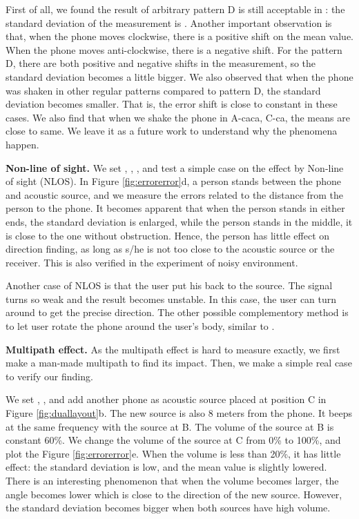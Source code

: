 \documentclass[]{sig-alternate-10pt}
\begin{document}
First of all, we found the result of arbitrary pattern D is still
 acceptable in : the standard deviation of the
 measurement is .
Another important observation is that, when the phone moves clockwise,
there is a positive shift on the mean value. 
When the phone moves anti-clockwise, there is a negative shift. 
For the pattern D, there are both positive and negative shifts in the
 measurement, so the standard deviation becomes a little bigger.
We also observed that when the phone was shaken in other regular
 patterns compared to pattern D, the standard deviation
 becomes smaller.
That is, the error shift is close
 to constant in these cases.
We also find that when we shake the phone in A-caca, C-ca, the
means are close to same.
We leave it as a future work to understand why the phenomena happen.

\noindent\textbf{Non-line of sight.}
 We set , , , and
 test a simple case on the effect by Non-line of sight (NLOS).  In
 Figure \ref{fig:errorerror}d, a person stands between the phone
 and acoustic source, and we measure the errors related to the
 distance from the person to the phone.
It becomes apparent that when the person
 stands in either ends, the standard deviation is enlarged, while the person stands
 in the middle, it is close to the one without
 obstruction.
Hence, the person has little effect on
 direction finding, as long as  s/he is not too close to the acoustic
 source or the receiver.
This is also verified in the experiment of noisy environment. 

Another case of NLOS is that the user put his back to the source. The
signal turns so weak and the result becomes unstable. In this case, the user can
turn around to get the precise direction. The other possible
complementory method is to let user rotate the phone around the user's
body, similar to \cite{2011-MOBICOM-Iamantenna}. 


\noindent\textbf{Multipath effect.} As the multipath effect is hard to
measure exactly, we first make a man-made multipath to find its
impact. Then, we make a simple real case to verify our finding.

We set , ,  and add another
 phone as acoustic source placed at position C in
 Figure \ref{fig:duallayout}b.
The new source is also 8 meters from the phone. It beeps at the same
frequency with the source at B. The volume of the
source at B is constant 60\%.  We change the volume of the source at
C from 0\% to 100\%, and plot the Figure \ref{fig:errorerror}e.
When the volume is less than 20\%, it has little effect: the
standard deviation is low, and the mean value is slightly lowered.
There is an interesting phenomenon that when the volume becomes
larger, the angle becomes lower which is close to the direction of the
new source. However, the standard deviation becomes bigger when both
sources have high volume.
\end{document}
